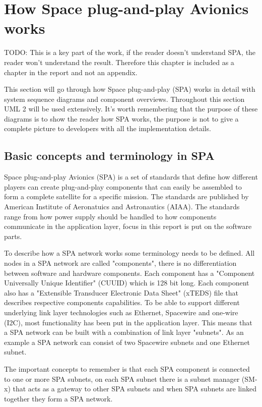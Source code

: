 \chapter{How Space plug-and-play Avionics works}\label{ch:spa}
TODO: This is a key part of the work, if the reader doesn't understand SPA, the
reader won't understand the result. Therefore this chapter is included as a
chapter in the report and not an appendix.

This section will go through how Space plug-and-play (SPA) works in detail with
system sequence diagrams and component overviews. Throughout this
section UML 2 will be used extensively. It's worth remembering that the
purpose of these diagrams is to show the reader how SPA works, the purpose
is not to give a complete picture to developers with all the implementation
details.

\section{Basic concepts and terminology in SPA}
Space plug-and-play Avionics (SPA) is a set of standards that define how
different players can create plug-and-play components that can easily be
assembled to form a complete satellite for a specific mission. The standards
are published by American Institute of Aeronatuics and Astronautics (AIAA). The
standards range from how power supply should be handled to how components
communicate in the application layer, focus in this report is put on the
software parts.

To describe how a SPA network works some terminology needs to be defined. All
nodes in a SPA network are called "components", there is no differentiation
between software and hardware components. Each component has a "Component
Universally Unique Identifier" (CUUID) which is 128 bit long. Each component
also has a "Extensible Transducer Electronic Data Sheet" (xTEDS) file that
describes respective components capabilities. To be able to support different
underlying link layer technologies such as Ethernet, Spacewire and one-wire
(I2C), most functionality has been put in the application layer. This means
that a SPA network can be built with a combination of link layer "subnets". As
an example a SPA network can consist of two Spacewire subnets and one Ethernet
subnet.

The important concepts to remember is that each SPA component is
connected to one or more SPA subnets, on each SPA subnet there is a subnet
manager (SM-x) that acts as a gateway to other SPA subnets and when SPA subnets
are linked together they form a SPA network.


